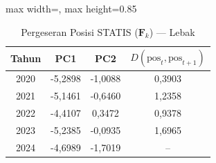 \begin{table}[H]
\centering
\caption{Pergeseran Posisi STATIS ($\mathbf{F}_k$) --- Lebak} \label{tab:app2jarak_statis_skor_lebak}
\begin{adjustbox}{max width=\textwidth, max height=0.85\textheight}
\begin{tabular}{|c|c|c|c|}
\hline
\textbf{Tahun} & \textbf{PC1} & \textbf{PC2} & \textbf{$D(\text{pos}_t, \text{pos}_{t+1})$} \\
\hline
2020 & -5,2898 & -1,0088 & 0,3903 \\
2021 & -5,1461 & -0,6460 & 1,2358 \\
2022 & -4,4107 & 0,3472 & 0,9378 \\
2023 & -5,2385 & -0,0935 & 1,6965 \\
2024 & -4,6989 & -1,7019 & -- \\
\hline
\end{tabular}
\end{adjustbox}
\end{table}